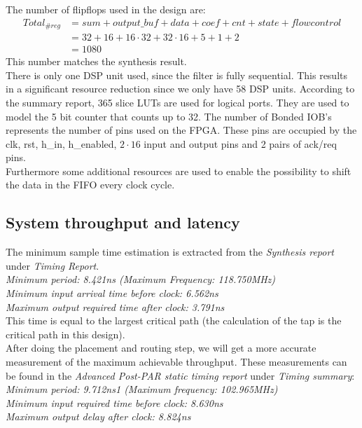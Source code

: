 \documentclass[a4paper,twoside,11pt, fleqn]{article}
\begin{document}
The number of flipflops used in the design are:
\begin{align*}
Total_{\#reg}	&= sum + output\_buf + data + coef + cnt + state + flow control\\
			&= 32 + 16 + 16\cdot 32 + 32\cdot 16 + 5 + 1 + 2\\
			&= 1080
\end{align*}
This number matches the synthesis result.\\

There is only one DSP unit used, since the filter is fully sequential. This results in a significant resource reduction since we only have 58 DSP units. According to the summary report, 365 slice LUTs are used for logical ports. They are used to model the 5 bit counter that counts up to 32. The number of Bonded IOB's represents the number of pins used on the FPGA. These pins are occupied by the clk, rst, h\_in, h\_enabled,  $2\cdot 16$ input and output pins and 2 pairs of ack/req pins.\\

Furthermore some additional resources are used to enable the possibility to shift the data in the FIFO every clock cycle.

\subsection{System throughput and latency}
\label{sec:3athrolat}
The minimum sample time estimation is extracted from the \textit{Synthesis report} under \textit{Timing Report}.\\

   \textit{Minimum period: 8.421ns (Maximum Frequency: 118.750MHz)\\
   Minimum input arrival time before clock: 6.562ns\\
   Maximum output required time after clock: 3.791ns}\\

This time is equal to the largest critical path (the calculation of the tap is the critical path in this design).\\

After doing the placement and routing step, we will get a more accurate measurement of the maximum achievable throughput. These measurements can be found in the \textit{Advanced Post-PAR static timing report} under \textit{Timing summary}:\\

\textit{Minimum period:   9.712ns{1}   (Maximum frequency: 102.965MHz)\\
   Minimum input required time before clock:   8.630ns\\
   Maximum output delay after clock:   8.824ns}\\
\end{document}
